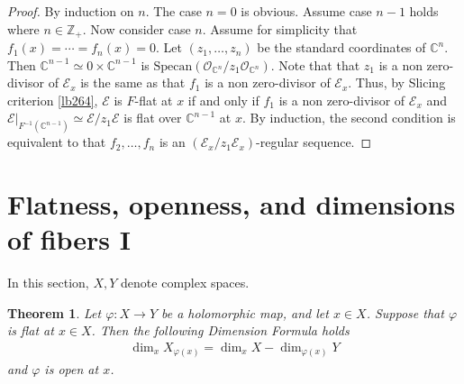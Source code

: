\documentclass[12pt,b5paper,notitlepage]{report}
\theoremstyle{definition}
\theoremstyle{plain}
\newtheorem{thm}[df]{Theorem}
\newcommand{\scr}{\mathscr}
\newcommand{\Cbb}{\mathbb C}
\newcommand{\Zbb}{\mathbb Z}
\newcommand{\Specan}{\mathrm{Specan}}
\numberwithin{equation}{section}
\begin{document}
\begin{proof}
By induction on $n$. The case $n=0$ is obvious. Assume case $n-1$ holds where $n\in\Zbb_+$. Now consider case $n$. Assume for simplicity that $f_1(x)=\cdots=f_n(x)=0$. Let $(z_1,\dots,z_n)$ be the standard coordinates of $\Cbb^n$. Then $\Cbb^{n-1}\simeq 0\times\Cbb^{n-1}$ is $\Specan(\scr O_{\Cbb^n}/z_1\scr O_{\Cbb^n})$. Note that that $z_1$ is a non zero-divisor of $\scr E_x$ is the same as that $f_1$ is a non zero-divisor of $\scr E_x$. Thus, by Slicing criterion \eqref{lb264}, $\scr E$ is $F$-flat at $x$ if and only if $f_1$ is a non zero-divisor of $\scr E_x$ and $\scr E|_{F^{-1}(\Cbb^{n-1})}\simeq\scr E/z_1\scr E$ is flat over $\Cbb^{n-1}$ at $x$. By induction, the second condition is equivalent to that $f_2,\dots,f_n$ is an $(\scr E_x/z_1\scr E_x)$-regular sequence.
\end{proof}








\section{Flatness, openness, and dimensions of fibers I}


In this section, $X,Y$ denote complex spaces.

\begin{thm}\label{lb286}
Let $\varphi:X\rightarrow Y$ be a holomorphic map, and let $x\in X$. Suppose that $\varphi$ is flat at $x\in X$. Then the following Dimension Formula holds
\begin{align}
\dim_x X_{\varphi(x)}=\dim_x X-\dim_{\varphi(x)} Y\label{eq127}
\end{align}
and $\varphi$ is open at $x$.
\end{thm}
\end{document}
